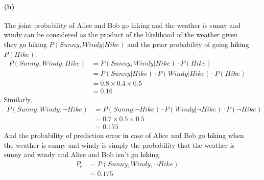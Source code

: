 \documentclass[a4paper]{article}
\begin{document}
\paragraph{(b)} The joint probability of Alice and Bob go hiking and the weather is sunny and windy can be considered as the product of the likelihood of the weather given they go hiking $P(Sunny, Windy | Hike)$ and the prior probability of going hiking $P(Hike)$.\\
	\begin{align}
		P(Sunny, Windy, Hike) &= P(Sunny, Windy | Hike) \cdot P(Hike)\\
			&= P(Sunny | Hike) \cdot P(Windy | Hike) \cdot P(Hike)\\
			&= 0.8 \times 0.4 \times 0.5\\
			&= 0.16
	\end{align}
	Similarly,
	\begin{align}
		P(Sunny, Windy, \neg Hike) &= P(Sunny | \neg Hike) \cdot P(Windy | \neg Hike) \cdot P(\neg Hike)\\
			&= 0.7 \times 0.5 \times 0.5\\
			&= 0.175
	\end{align}
	And the probability of prediction error in case of Alice and Bob go hiking when the weather is sunny and windy is simply the probability that the weather is sunny and windy and Alice and Bob isn't go hiking. 
	\begin{align}
		P_e &= P(Sunny, Windy,\neg Hike) \\
			&= 0.175
	\end{align}
	
\end{document}
